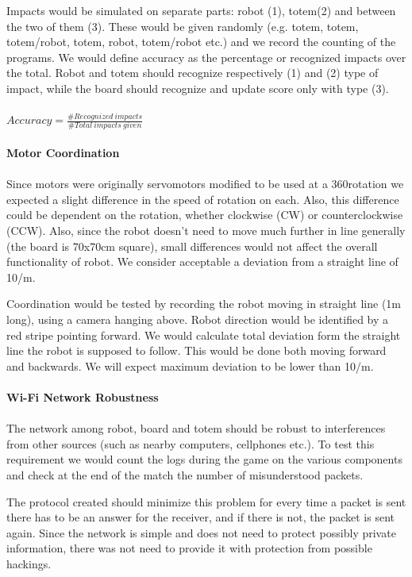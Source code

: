 \documentclass[a4paper,twoside]{book}
\begin{document}
Impacts would be simulated on separate parts: robot (1), totem(2) and between the two of them (3). These would be given randomly (e.g. totem, totem, totem/robot, totem, robot, totem/robot etc.) and we record the counting of the programs. We would define accuracy as the percentage or recognized impacts over the total. Robot and totem should recognize respectively (1) and (2) type of impact, while the board should recognize and update score only with type (3).
\\
\\
$Accuracy=\frac{\#Recognized\ impacts}{\#Total\ impacts\ given}$
\\
\\
\textbf{Motor Coordination}
\\
\\
Since motors were originally servomotors modified to be used at a 360\degree rotation we expected a slight difference in the speed of rotation on each. Also, this difference could be dependent on the rotation, whether clockwise (CW) or counter\textendash clockwise (CCW). Also, since the robot doesn't need to move much further in line generally (the board is 70x70cm square), small differences would not affect the overall functionality of robot. We consider acceptable a deviation from a straight line of 10\degree/m.

Coordination would be tested by recording the robot moving in straight line (1m long), using a camera hanging above. Robot direction would be identified by a red stripe pointing forward. We would calculate total deviation form the straight line the robot is supposed to follow. This would be done both moving forward and backwards. We will expect maximum deviation to be lower than 10\degree/m.
\\
\\
\textbf{Wi-Fi Network Robustness}
\\
\\
The network among robot, board and totem should be robust to interferences from other sources (such as nearby computers, cellphones etc.). To test this requirement we would count the logs during the game on the various components and check at the end of the match the number of misunderstood packets. 

The protocol created should minimize this problem for every time a packet is sent there has to be an answer for the receiver, and if there is not, the packet is sent again. Since the network is simple and does not need to protect possibly private information, there was not need to provide it with protection from possible hackings.
\end{document}
